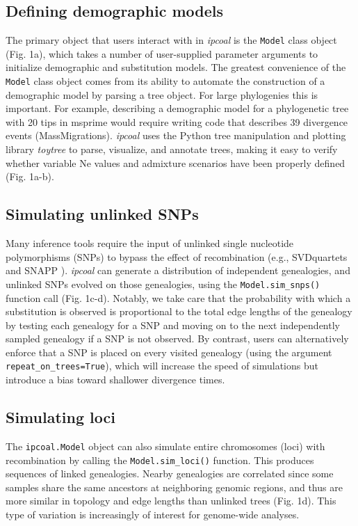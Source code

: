 \documentclass[11pt]{article}
\begin{document}
\subsection{Defining demographic models}
The primary object that users interact with in \emph{ipcoal} is the \texttt{Model} class object (Fig. 1a), which takes a number of user-supplied parameter arguments to initialize demographic and substitution models. The greatest convenience of the \texttt{Model} class object comes from its ability to automate the construction of a demographic model by parsing a tree object. For large phylogenies this is important. For example, describing a demographic model for a phylogenetic tree with 20 tips in msprime would require writing code that describes 39 divergence events (MassMigrations). \emph{ipcoal} uses the Python tree manipulation and plotting library \emph{toytree} \citep{eaton_toytree_2020} to parse, visualize, and annotate trees, making it easy to verify whether variable Ne values and admixture scenarios have been properly defined (Fig. 1a-b). 

\subsection{Simulating unlinked SNPs}
Many inference tools require the input of unlinked single nucleotide polymorphisms (SNPs) to bypass the effect of recombination (e.g., SVDquartets \citep{chifman_quartets_2014} and SNAPP \citep{bryant_snapp_2012}). \emph{ipcoal} can generate a distribution of independent genealogies, and unlinked SNPs evolved on those genealogies, using the \texttt{Model.sim\_snps()} function call (Fig. 1c-d). Notably, we take care that the probability with which a substitution is observed is proportional to the total edge lengths of the genealogy by testing each genealogy for a SNP and moving on to the next independently sampled genealogy if a SNP is not observed. By contrast, users can alternatively enforce that a SNP is placed on every visited genealogy (using the argument \texttt{repeat\_on\_trees=True}), which will increase the speed of simulations but introduce a bias toward shallower divergence times. 

\subsection{Simulating loci}
The \texttt{ipcoal.Model} object can also simulate entire chromosomes (loci) with recombination by calling the \texttt{Model.sim\_loci()} function. This produces sequences of linked genealogies. Nearby genealogies are correlated since some samples share the same ancestors at neighboring genomic regions, and thus are more similar in topology and edge lengths than unlinked trees (Fig. 1d). This type of variation is increasingly of interest for genome-wide analyses.
\end{document}

